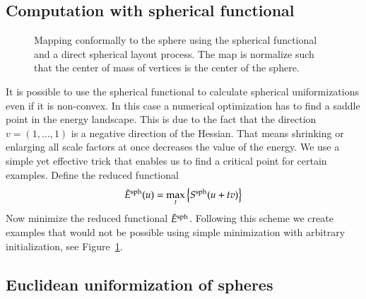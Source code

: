 \documentclass[Thesis]{subfiles}
\begin{document}
\subsection{Computation with spherical functional}
\label{sec:spherical_computation}

\begin{figure}
\centering
{}
\quad\quad\quad{}
\caption{Mapping conformally to the sphere using the spherical functional and a direct spherical layout process. The map is normalize such that the center of mass of vertices is the center of the sphere.}
\label{fig:spherical_examples}
\end{figure}

It is possible to use the spherical functional to calculate spherical uniformizations even if it is non-convex. In this case a numerical optimization has to find a saddle point in the energy landscape. This is due to the fact that the direction $v=(1,\ldots,1)$ is a negative direction of the Hessian. That means shrinking or enlarging all scale factors at once decreases the value of the energy. We use a simple yet effective trick that enables us to find a critical point for certain examples. Define the reduced functional
\begin{equation}
\label{eq:reduced_spherical}
\tilde E^{\rm sph}(u)=\max_t \left\{S^{\rm sph}(u + tv)\right\}
\end{equation}
Now minimize the reduced functional $\tilde  E^{\rm sph}$. 
Following this scheme we create examples that would not be possible using simple minimization with arbitrary initialization, see Figure~\ref{fig:spherical_examples}.

\subsection{Euclidean uniformization of spheres}
\end{document}
